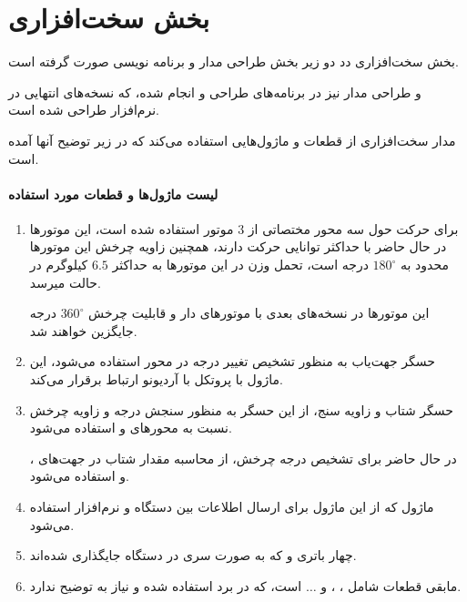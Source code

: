 \documentclass[a4paper,12pt]{report}
\begin{document}
	\section{
	بخش سخت‌افزاری
	}\label{sec3:chap2}

	بخش سخت‌افزاری دد دو زیر بخش طراحی مدار و برنامه نویسی
	صورت گرفته است.

	و طراحی مدار نیز در برنامه‌های طراحی
	و
	انجام شده، که نسخه‌های انتهایی در نرم‌افزار
	طراحی شده است.

	مدار سخت‌افزاری از قطعات و ماژول‌هایی استفاده می‌کند که در زیر توضیح آنها آمده است.

	\paragraph{
	لیست ماژول‌ها و قطعات مورد استفاده}
	\begin{enumerate}[nosep]
		\item
			برای حرکت حول سه محور مختصاتی از
			$3$
			موتور
			استفاده شده است، این موتور‌ها در حال حاضر با حداکثر
			توانایی حرکت دارند، همچنین زاویه چرخش این موتور‌ها محدود به
			$180^{\circ}$
			درجه است، تحمل وزن در این موتور‌ها به حداکثر
			$ 6.5 $
			کیلوگرم در حالت
			میرسد.

			این موتور‌ها در نسخه‌های بعدی با موتور‌های
			دار و قابلیت چرخش
			$360^{\circ}$
			درجه جایگزین خواهند شد.
		\item
			حسگر جهت‌یاب به منظور تشخیص تغییر درجه در محور
			استفاده می‌شود، این ماژول با پروتکل
			با آردیونو ارتباط برقرار می‌کند.
		\item
			حسگر شتاب و زاویه سنج، از این حسگر به منظور سنجش درجه‌ و زاویه چرخش نسبت به محور‌های
			و
			استفاده می‌شود.

			\danger
			در حال حاضر برای تشخیص درجه چرخش، از محاسبه مقدار شتاب در جهت‌های
			،  و  
			استفاده می‌شود.
		\item
			ماژول
			که از این ماژول برای ارسال اطلاعات بین دستگاه و نرم‌افزار استفاده می‌شود.
		\item
			چهار باتری
			 و
			که به صورت سری در دستگاه جایگذاری شده‌اند.
			   ‍
		\item
		مابقی قطعات شامل
		،  ، 
		و
		$\dots$
		 است، که در برد استفاده شده و نیاز به توضیح ندارد.
	\end{enumerate}
\end{document}
